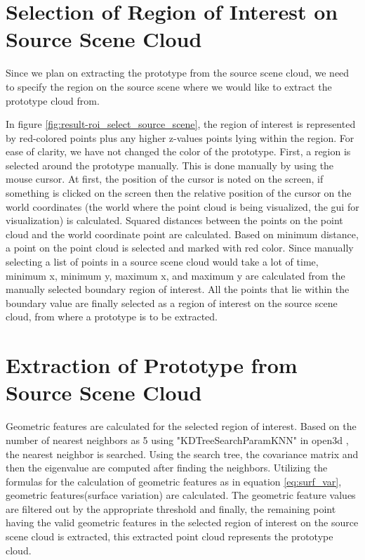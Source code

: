 \section{Selection of Region of Interest on Source Scene Cloud}
Since we plan on extracting the prototype from the source scene cloud, we need to specify the region on the source scene where we would like to extract the prototype cloud from.



In figure \ref{fig:result-roi_select_source_scene}, the region of interest is represented by red-colored points plus any higher z-values points lying within the region. For ease of clarity, we have not changed the color of the prototype. First, a region is selected around the prototype manually. This is done manually by using the mouse cursor. At first, the position of the cursor is noted on the screen, if something is clicked on the screen then the relative position of the cursor on the world coordinates (the world where the point cloud is being visualized, the \acrshort{gui} for visualization) is calculated. Squared distances between the points on the point cloud and the world coordinate point are calculated. Based on minimum distance, a point on the point cloud is selected and marked with red color. Since manually selecting a list of points in a source scene cloud would take a lot of time, minimum x, minimum y, maximum x, and maximum y are calculated from the manually selected boundary region of interest. All the points that lie within the boundary value are finally selected as a region of interest on the source scene cloud, from where a prototype is to be extracted.

\section{Extraction of Prototype from Source Scene Cloud}
Geometric features are calculated for the selected region of interest. Based on the number of nearest neighbors as 5 using "KDTreeSearchParamKNN" in open3d \parencite{open3d}, the nearest neighbor is searched. Using the search tree, the covariance matrix and then the eigenvalue are computed after finding the neighbors. Utilizing the formulas for the calculation of geometric features as in equation \ref{eq:surf_var}, geometric features(surface variation) are calculated. The geometric feature values are filtered out by the appropriate threshold and finally, the remaining point having the valid geometric features in the selected region of interest on the source scene cloud is extracted, this extracted point cloud represents the prototype cloud.

